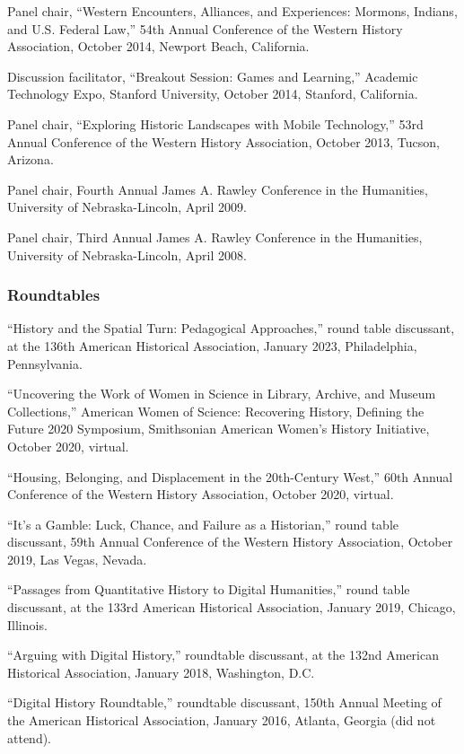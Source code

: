 Panel chair, ``Western Encounters, Alliances, and Experiences: Mormons,
Indians, and U.S. Federal Law,'' 54th Annual Conference of the Western
History Association, October 2014, Newport Beach, California.

Discussion facilitator, ``Breakout Session: Games and Learning,''
Academic Technology Expo, Stanford University, October 2014, Stanford,
California.

Panel chair, ``Exploring Historic Landscapes with Mobile Technology,''
53rd Annual Conference of the Western History Association, October 2013,
Tucson, Arizona.

Panel chair, Fourth Annual James A. Rawley Conference in the Humanities,
University of Nebraska-Lincoln, April 2009.

Panel chair, Third Annual James A. Rawley Conference in the Humanities,
University of Nebraska-Lincoln, April 2008.

\subsubsection{Roundtables}\label{roundtables}

``History and the Spatial Turn: Pedagogical Approaches,'' round table
discussant, at the 136th American Historical Association, January 2023,
Philadelphia, Pennsylvania.

``Uncovering the Work of Women in Science in Library, Archive, and
Museum Collections,'' American Women of Science: Recovering History,
Defining the Future 2020 Symposium, Smithsonian American Women's History
Initiative, October 2020, virtual.

``Housing, Belonging, and Displacement in the 20th-Century West,'' 60th
Annual Conference of the Western History Association, October 2020,
virtual.

``It's a Gamble: Luck, Chance, and Failure as a Historian,'' round table
discussant, 59th Annual Conference of the Western History Association,
October 2019, Las Vegas, Nevada.

``Passages from Quantitative History to Digital Humanities,'' round
table discussant, at the 133rd American Historical Association, January
2019, Chicago, Illinois.

``Arguing with Digital History,'' roundtable discussant, at the 132nd
American Historical Association, January 2018, Washington, D.C.

``Digital History Roundtable,'' roundtable discussant, 150th Annual
Meeting of the American Historical Association, January 2016, Atlanta,
Georgia (did not attend).

